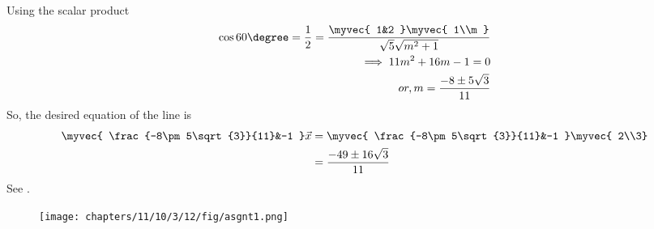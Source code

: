 Using the scalar product
\begin{align}
  \cos{60\degree}=
\frac{1}{2}=\frac{\myvec{
        1&2
    }\myvec{
        1\\m
    }}{\sqrt{5}\sqrt{m^2+1}}\\
\implies 11m^2+16m-1=0\\
   or, m=\frac{-8\pm5\sqrt{3}}{11}    
\end{align}
So, the desired equation of the line is
\begin{align}
\myvec{
    \frac{-8\pm5\sqrt{3}}{11}&-1
}\vec{x} 
	&=
\myvec{
    \frac{-8\pm5\sqrt{3}}{11}&-1
}
\myvec{
    2\\3}
    \\
	&=\frac{-49\pm16\sqrt{3}}{11}
\end{align}
See 
    .
\begin{figure}[H]
    \centering
    \texttt{[image: chapters/11/10/3/12/fig/asgnt1.png]}
    \caption{}
    \label{fig:11.10.3.12}
\end{figure}

